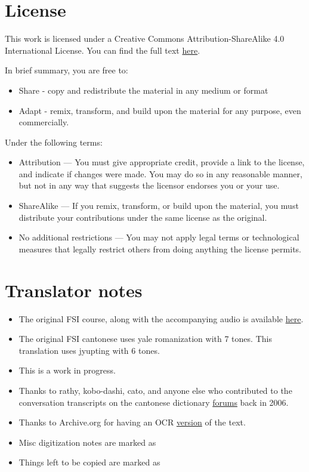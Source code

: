 \section{License}

This work is licensed under a Creative Commons Attribution-ShareAlike 4.0 International License. You can find the full text \href{https://creativecommons.org/licenses/by-sa/4.0/}{here}.

In brief summary, you are free to:

\begin{itemize}
	\item Share - copy and redistribute the material in any medium or format
	\item Adapt - remix, transform, and build upon the material for any purpose, even commercially.
\end{itemize}

Under the following terms:

\begin{itemize}
	\item Attribution — You must give appropriate credit, provide a link to the license, and indicate if changes were made. You may do so in any reasonable manner, but not in any way that suggests the licensor endorses you or your use.
	\item ShareAlike — If you remix, transform, or build upon the material, you must distribute your contributions under the same license as the original.
	\item No additional restrictions — You may not apply legal terms or technological measures that legally restrict others from doing anything the license permits.
\end{itemize}

\section{Translator notes}

\begin{itemize}
    \item The original FSI course, along with the accompanying audio is available \href{https://fsi-languages.yojik.eu/languages/FSI/fsi-cantonese.html}{here}.
    \item The original FSI cantonese uses yale romanization with 7 tones. This translation uses jyupting with 6 tones.
    \item This is a work in progress.
    \item Thanks to rathy, kobo-dashi, cato, and anyone else who contributed to the conversation transcripts on the cantonese dictionary \href{http://www.cantonese.sheik.co.uk/phorum/read.php?1,53361,page=1}{forums} back in 2006.
    \item Thanks to Archive.org for having an OCR \href{https://archive.org/stream/Fsi-CantoneseBasicCourse-StudentText/Fsi-CantoneseBasicCourse-Volume1-StudentText_djvu.txt}{version} of the text.
    \item Misc digitization notes are marked as 
    \item Things left to be copied are marked as 
\end{itemize}
